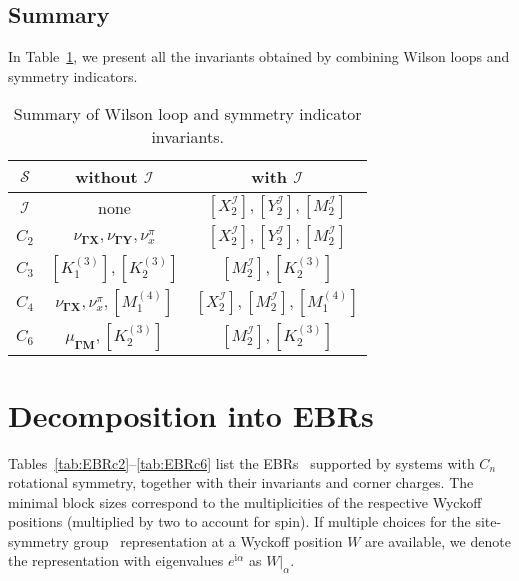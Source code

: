 \subsection{Summary}
In Table~\ref{tab:summaryofindicators}, we present all the invariants obtained by combining Wilson loops and symmetry indicators.
\begin{table}[htbp]
\centering
\begin{tabular}{| c || c | c |}
\hline
$\mathcal{S}$ & without $\mathcal{I}$ & with $\mathcal{I}$ \\ 
\hline
$\mathcal{I}$ & none & $[X^\mathcal{I}_2],[Y^\mathcal{I}_2],[M^\mathcal{I}_2]$ \\ \hline
$C_2$  & $\nu_{\mathbf{\Gamma X}},\nu_{\mathbf{\Gamma Y}},\nu_{x}^{\pi}$                      & $[X^\mathcal{I}_2],[Y^\mathcal{I}_2],[M^\mathcal{I}_2]$                      \\ \hline
$C_3$  & $[K^{(3)}_1],[K^{(3)}_2]$                      & $[M^\mathcal{I}_2],[K^{(3)}_2]$                      \\ \hline
$C_4$  & $\nu_{\mathbf{\Gamma X}}, \nu_{x}^{\pi}, [M_1^{(4)}]$                      & $[X^\mathcal{I}_2],[M^\mathcal{I}_2], [M_1^{(4)}]
$                      \\ \hline
$C_6$  & $\mu_{\mathbf{\Gamma M}},[K^{(3)}_2]$                      & $[M^\mathcal{I}_2],[K^{(3)}_2]$                      \\ \hline
\end{tabular}
\caption[Summary of Wilson loop and symmetry indicator invariants]{Summary of Wilson loop and symmetry indicator invariants.}
\label{tab:summaryofindicators}
\end{table}

\section{Decomposition into EBRs}
\label{sec:EBRdecomposition}
Tables~\ref{tab:EBRc2}--\ref{tab:EBRc6} list the EBRs~\cite{Slager12,Slager17,Bradlyn17,Cano17,Cano17-2,BarryFragile,ZakPhase1,ZakPhase2} supported by systems with $C_n$ rotational symmetry, together with their invariants and corner charges. The minimal block sizes correspond to the multiplicities of the respective Wyckoff positions (multiplied by two to account for spin). If multiple choices for the site-symmetry group~\cite{Bradlyn17} representation at a Wyckoff position $W$ are available, we denote the representation with eigenvalues $e^{\mathrm{i} \alpha}$ as $W|_{\alpha}$.


